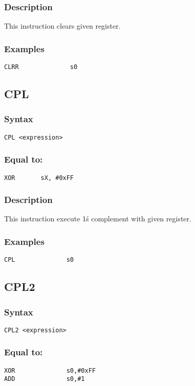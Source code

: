         \subsubsection{Description}
            This instruction clears given register.

        \subsubsection{Examples}
            \verb'CLRR              s0'

    \subsection{CPL}
        \subsubsection{Syntax}
            \verb'CPL <expression>'

        \subsubsection{Equal to:}
            \verb'XOR       sX, #0xFF'

        \subsubsection{Description}
            This instruction execute 1\'s complement with given register.

        \subsubsection{Examples}
            \verb'CPL              s0'

    \subsection{CPL2}
        \subsubsection{Syntax}
            \verb'CPL2 <expression>'

        \subsubsection{Equal to:}
            \verb'XOR              s0,#0xFF'\\
            \verb'ADD              s0,#1'


